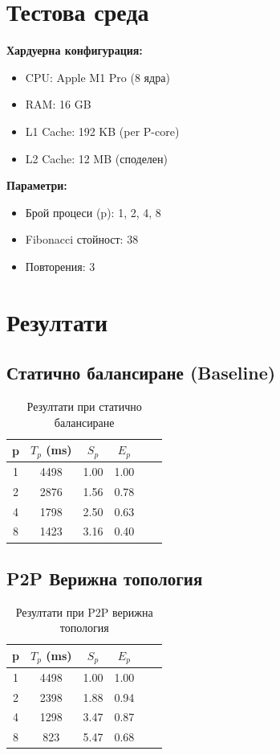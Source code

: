 \documentclass[12pt,a4paper]{article}
\begin{document}
\section{Тестова среда}

\textbf{Хардуерна конфигурация:}
\begin{itemize}
    \item CPU: Apple M1 Pro (8 ядра)
    \item RAM: 16 GB
    \item L1 Cache: 192 KB (per P-core)
    \item L2 Cache: 12 MB (споделен)
\end{itemize}

\textbf{Параметри:}
\begin{itemize}
    \item Брой процеси (p): 1, 2, 4, 8
    \item Fibonacci стойност: 38
    \item Повторения: 3
\end{itemize}

\section{Резултати}

\subsection{Статично балансиране (Baseline)}

\begin{table}[H]
\centering
\begin{tabular}{cccccc}
\toprule
\textbf{p} & \textbf{$T_p$ (ms)} & \textbf{$S_p$} & \textbf{$E_p$} \\
\midrule
1 & 4498 & 1.00 & 1.00 \\
2 & 2876 & 1.56 & 0.78 \\
4 & 1798 & 2.50 & 0.63 \\
8 & 1423 & 3.16 & 0.40 \\
\bottomrule
\end{tabular}
\caption{Резултати при статично балансиране}
\end{table}

\subsection{P2P Верижна топология}

\begin{table}[H]
\centering
\begin{tabular}{cccccc}
\toprule
\textbf{p} & \textbf{$T_p$ (ms)} & \textbf{$S_p$} & \textbf{$E_p$} \\
\midrule
1 & 4498 & 1.00 & 1.00 \\
2 & 2398 & 1.88 & 0.94 \\
4 & 1298 & 3.47 & 0.87 \\
8 & 823 & 5.47 & 0.68 \\
\bottomrule
\end{tabular}
\caption{Резултати при P2P верижна топология}
\end{table}
\end{document}

